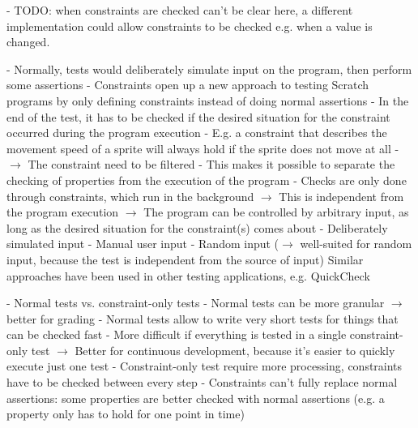 - TODO: when constraints are checked can't be clear here, a different implementation could allow constraints to be checked e.g. when a value is changed.

- Normally, tests would deliberately simulate input on the program, then perform some assertions
- Constraints open up a new approach to testing Scratch programs by only defining constraints instead of doing normal assertions
- In the end of the test, it has to be checked if the desired situation for the constraint occurred during the program execution
    - E.g. a constraint that describes the movement speed of a sprite will always hold if the sprite does not move at all
    - $\rightarrow$ The constraint need to be filtered
- This makes it possible to separate the checking of properties from the execution of the program
    - Checks are only done through constraints, which run in the background
    $\rightarrow$ This is independent from the program execution
    $\rightarrow$ The program can be controlled by arbitrary input, as long as the desired situation for the constraint(s) comes about
        - Deliberately simulated input
        - Manual user input
        - Random input ($\rightarrow$ well-suited for random input, because the test is independent from the source of input)
          Similar approaches have been used in other testing applications, e.g. QuickCheck \cite{quickcheck}

- Normal tests vs. constraint-only tests
    - Normal tests can be more granular $\rightarrow$ better for grading
    - Normal tests allow to write very short tests for things that can be checked fast
        - More difficult if everything is tested in a single constraint-only test
        $\rightarrow$ Better for continuous development, because it's easier to quickly execute just one test
    - Constraint-only test require more processing, constraints have to be checked between every step
    - Constraints can't fully replace normal assertions: some properties are better checked with normal assertions (e.g. a property only has to hold for one point in time)

